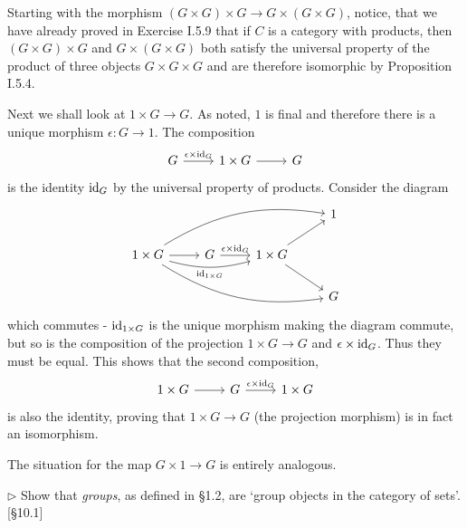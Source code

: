 \begin{solution}
	Starting with the morphism $(G \times G) \times G \to G \times (G \times G)$, notice, that we have already proved in Exercise I.5.9 that if $C$ is a category with products, then $(G \times G) \times G$ and $G \times (G \times G)$ both satisfy the universal property of the product of three objects $G \times G \times G$ and are therefore isomorphic by Proposition I.5.4.
	
	Next we shall look at $1 \times G \to G$. As noted, $1$ is final and therefore there is a unique morphism $\epsilon: G \to 1$. The composition
	\[
		\begin{tikzcd}
			G \arrow[r, "\epsilon \times \id_G"] & 1 \times G \arrow[r] & G
		\end{tikzcd}
	\]
	is the identity $\mathrm{id}_G$ by the universal property of products. Consider the diagram
	\[
		\begin{tikzcd}
			& & & 1 \\
			1 \times G
			\arrow[urrr, bend left=20]
			\arrow[r]
			\arrow[rr, bend right=15, "\id_{1 \times G}"']
			\arrow[drrr, bend right=20]
			& G
			\arrow[r, "\epsilon \times \id_G"]
			& 1 \times G
			\arrow[ur]
			\arrow[dr] \\
			& & & G
		\end{tikzcd}
	\]
	which commutes - $\mathrm{id}_{1 \times G}$ is the unique morphism making the diagram commute, but so is the composition of the projection $1 \times G \to G$ and $\epsilon \times \mathrm{id}_G$. Thus they must be equal. This shows that the second composition,
	\[
	\begin{tikzcd}
		1 \times G \arrow[r] & G \arrow[r, "\epsilon \times \id_G"] & 1 \times G
	\end{tikzcd}
	\]
	is also the identity, proving that $1 \times G \to G$ (the projection morphism) is in fact an isomorphism.
	
	The situation for the map $G \times 1 \to G$ is entirely analogous.
\end{solution}

\begin{problem}
	$\triangleright$ Show that \emph{groups}, as defined in \S 1.2, are `group objects in the category of sets'. [\S 10.1]
\end{problem}


